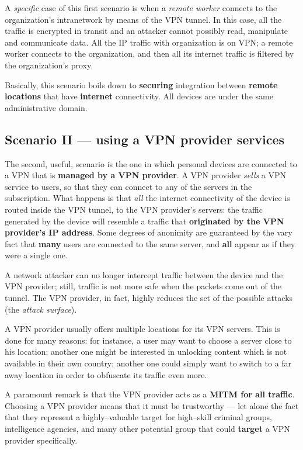 \documentclass[10pt]{extreport}
\begin{document}
A \emph{specific} case of this first scenario is when a \emph{remote worker}
connects to the organization's intranetwork by means of the VPN tunnel. In this
case, all the traffic is encrypted in transit and an attacker cannot possibly
read, manipulate and communicate data. All the IP traffic with organization is
on VPN; a remote worker connects to the organization, and then all its internet
traffic is filtered by the organization's proxy.

Basically, this scenario boils down to \textbf{securing} integration between
\textbf{remote locations} that have \textbf{internet} connectivity. All devices
are under the same administrative domain.

\subsection{Scenario II --- using a VPN provider services}

The second, useful, scenario is the one in which personal devices are connected
to a VPN that is \textbf{managed by a VPN provider}. A VPN provider
\emph{sells} a VPN service to users, so that they can connect to any of the
servers in the subscription. What happens is that \emph{all} the internet
connectivity of the device is routed inside the VPN tunnel, to the VPN
provider's servers: the traffic generated by the device will resemble a traffic
that \textbf{originated by the VPN provider's IP address}. Some degrees of
anonimity are guaranteed by the vary fact that \textbf{many} users are
connected to the same server, and \textbf{all} appear as if they were a single
one.

A network attacker can no longer intercept traffic between the device and the
VPN provider; still, traffic is not more safe when the packets come out of the
tunnel. The VPN provider, in fact, highly reduces the set of the possible
attacks (the \emph{attack surface}).

A VPN provider usually offers multiple locations for its VPN servers. This is
done for many reasons: for instance, a user may want to choose a server close
to his location; another one might be interested in unlocking content which is
not available in their own country; another one could simply want to switch to
a far away location in order to obfuscate its traffic even more.

A paramount remark is that the VPN provider acts as a \textbf{MITM for all
traffic}. Choosing a VPN provider means that it must be trustworthy --- let
alone the fact that they represent a highly--valuable target for high--skill
criminal groups, intelligence agencies, and many other potential group that
could \textbf{target} a VPN provider specifically.
\end{document}
